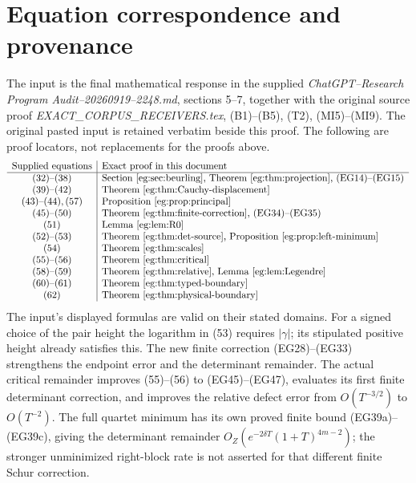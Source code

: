 \documentclass[11pt]{article}
\begin{document}
\section{Equation correspondence and provenance}\label{eg:sec:correspondence}
The input is the final mathematical response in the supplied
\emph{ChatGPT--Research Program Audit--20260919--2248.md}, sections
5--7, together with the original source proof
\emph{EXACT\_CORPUS\_RECEIVERS.tex}, (B1)--(B5), (T2), (MI5)--(MI9).
The original pasted input is retained verbatim beside this proof.
The following are proof locators, not replacements for the proofs above.
\[
\begin{array}{c|l}
\text{Supplied equations}&\text{Exact proof in this document}\\\hline
(32)\text{--}(38)&\text{Section \ref{eg:sec:beurling}, Theorem \ref{eg:thm:projection}, (EG14)--(EG15)}\\
(39)\text{--}(42)&\text{Theorem \ref{eg:thm:Cauchy-displacement}}\\
(43)\text{--}(44),(57)&\text{Proposition \ref{eg:prop:principal}}\\
(45)\text{--}(50)&\text{Theorem \ref{eg:thm:finite-correction}, (EG34)--(EG35)}\\
(51)&\text{Lemma \ref{eg:lem:R0}}\\
(52)\text{--}(53)&\text{Theorem \ref{eg:thm:det-source}, Proposition \ref{eg:prop:left-minimum}}\\
(54)&\text{Theorem \ref{eg:thm:scales}}\\
(55)\text{--}(56)&\text{Theorem \ref{eg:thm:critical}}\\
(58)\text{--}(59)&\text{Theorem \ref{eg:thm:relative}, Lemma \ref{eg:lem:Legendre}}\\
(60)\text{--}(61)&\text{Theorem \ref{eg:thm:typed-boundary}}\\
(62)&\text{Theorem \ref{eg:thm:physical-boundary}}
\end{array}
\]
The input's displayed formulas are valid on their stated domains.
For a signed choice of the pair height the logarithm in (53) requires
$|\gamma|$; its stipulated positive height already satisfies this.
The new finite correction (EG28)--(EG33) strengthens the endpoint
error and the determinant remainder. The actual critical remainder
improves (55)--(56) to (EG45)--(EG47), evaluates its first finite
determinant correction, and improves the relative defect error from
$O(T^{-3/2})$ to $O(T^{-2})$. The full quartet minimum has its own
proved finite bound (EG39a)--(EG39c), giving the determinant
remainder $O_Z(e^{-2\delta T}(1+T)^{4m-2})$; the stronger
unminimized right-block rate is not asserted for that different
finite Schur correction.
\end{document}
